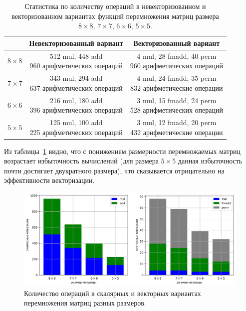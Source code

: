 \begin{table}
\centering
\singlespacing
{}\caption{Статистика по количеству операций в невекторизованном и векторизованном вариантах функций перемножения матриц размера $8 \times 8$, $7 \times 7$, $6 \times 6$, $5 \times 5$.}
\bigskip
\label{tbl:text_4_spec_matr_tabl}
\begin{tabular}{ | c | c | c | }
  \hline
  \ & Невекторизованный вариант & Векторизованный вариант \\ \hline\hline
  $8 \times 8$ & \makecell{512 mul, 448 add \\ 960 арифметических операций} & \makecell{4 mul, 28 fmadd, 40 perm \\ 960 арифметических операций} \\ \hline
  $7 \times 7$ & \makecell{343 mul, 294 add \\ 637 арифметических операций} & \makecell{4 mul, 24 fmadd, 35 perm \\ 832 арифметические операции} \\ \hline
  $6 \times 6$ & \makecell{216 mul, 180 add \\ 396 арифметических операций} & \makecell{3 mul, 15 fmadd, 24 perm \\ 528 арифметических операций} \\ \hline
  $5 \times 5$ & \makecell{125 mul, 100 add \\ 225 арифметических операций} & \makecell{3 mul, 12 fmadd, 20 perm \\ 432 арифметические операции}
 \\ \hline
\end{tabular}
\end{table}

Из таблицы~\ref{tbl:text_4_spec_matr_tabl} видно, что с понижением размерности перемножаемых матриц возрастает избыточность вычислений (для размера $5 \times 5$ данная избыточность почти достигает двукратного размера), что сказывается отрицательно на эффективности векторизации.

\begin{figure}[ht]
\centering
\includegraphics[width=1.00\textwidth]{./pics/text_4_spec_matr/stat.png}
\singlespacing
{}\caption{Количество операций в скалярных и векторных вариантах перемножения матриц разных размеров.}
\label{fig:text_4_spec_matr_stat}
\end{figure}

